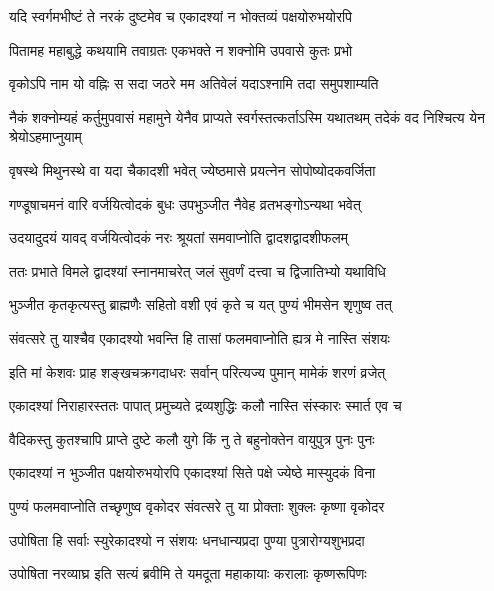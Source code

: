 
\twolineshloka
{यदि स्वर्गमभीष्टं ते नरकं दुष्टमेव च}
{एकादश्यां न भोक्तव्यं पक्षयोरुभयोरपि}%


\twolineshloka
{पितामह महाबुद्धे कथयामि तवाग्रतः}
{एकभक्ते न शक्नोमि उपवासे कुतः प्रभो}%

\twolineshloka
{वृकोऽपि नाम यो वह्निः स सदा जठरे मम}
{अतिवेलं यदाऽश्नामि तदा समुपशाम्यति}%

\threelineshloka
{नैकं शक्नोम्यहं कर्तुमुपवासं महामुने}
{येनैव प्राप्यते स्वर्गस्तत्कर्ताऽस्मि यथातथम्}
{तदेकं वद निश्चित्य येन श्रेयोऽहमाप्नुयाम्}%


\twolineshloka
{वृषस्थे मिथुनस्थे वा यदा चैकादशी भवेत्}
{ज्येष्ठमासे प्रयत्नेन सोपोष्योदकवर्जिता}%

\twolineshloka
{गण्डूषाचमनं वारि वर्जयित्वोदकं बुधः}
{उपभुञ्जीत नैवेह व्रतभङ्गोऽन्यथा भवेत्}%

\twolineshloka
{उदयादुदयं यावद् वर्जयित्वोदकं नरः}
{श्रूयतां समवाप्नोति द्वादशद्वादशीफलम्}%

\twolineshloka
{ततः प्रभाते विमले द्वादश्यां स्नानमाचरेत्}
{जलं सुवर्णं दत्त्वा च द्विजातिभ्यो यथाविधि}%

\twolineshloka
{भुञ्जीत कृतकृत्यस्तु ब्राह्मणैः सहितो वशी}
{एवं कृते च यत् पुण्यं भीमसेन शृणुष्व तत्}%

\twolineshloka
{संवत्सरे तु याश्चैव एकादश्यो भवन्ति हि}
{तासां फलमवाप्नोति ह्यत्र मे नास्ति संशयः}%

\twolineshloka
{इति मां केशवः प्राह शङ्खचक्रगदाधरः}
{सर्वान् परित्यज्य पुमान् मामेकं शरणं व्रजेत्}%

\twolineshloka
{एकादश्यां निराहारस्ततः पापात् प्रमुच्यते}
{द्रव्यशुद्धिः कलौ नास्ति संस्कारः स्मार्त एव च}%

\twolineshloka
{वैदिकस्तु कुतश्चापि प्राप्ते दुष्टे कलौ युगे}
{किं नु ते बहुनोक्तेन वायुपुत्र पुनः पुनः}%

\twolineshloka
{एकादश्यां न भुञ्जीत पक्षयोरुभयोरपि}
{एकादश्यां सिते पक्षे ज्येष्ठे मास्युदकं विना}%

\twolineshloka
{पुण्यं फलमवाप्नोति तच्छृणुष्व वृकोदर}
{संवत्सरे तु या प्रोक्ताः शुक्लः कृष्णा वृकोदर}%

\twolineshloka
{उपोषिता हि सर्वाः स्युरेकादश्यो न संशयः}
{धनधान्यप्रदा पुण्या पुत्रारोग्यशुभप्रदा}%

\twolineshloka
{उपोषिता नरव्याघ्र इति सत्यं ब्रवीमि ते}
{यमदूता महाकायाः करालाः कृष्णरूपिणः}%

